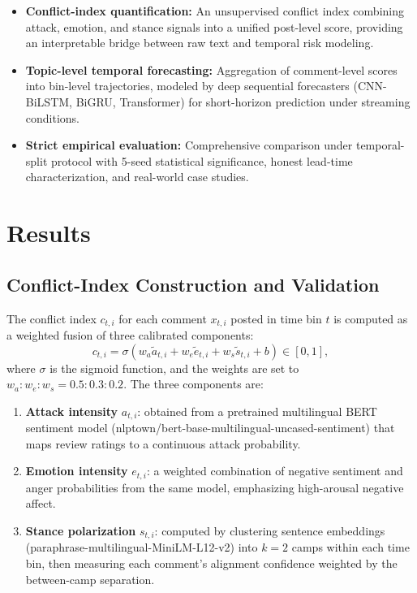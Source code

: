 \documentclass[11pt,a4paper]{article}
\begin{document}
\begin{itemize}
\item \textbf{Conflict-index quantification:} An unsupervised conflict index combining attack, emotion, and stance signals into a unified post-level score, providing an interpretable bridge between raw text and temporal risk modeling.
\item \textbf{Topic-level temporal forecasting:} Aggregation of comment-level scores into bin-level trajectories, modeled by deep sequential forecasters (CNN-BiLSTM, BiGRU, Transformer) for short-horizon prediction under streaming conditions.
\item \textbf{Strict empirical evaluation:} Comprehensive comparison under temporal-split protocol with 5-seed statistical significance, honest lead-time characterization, and real-world case studies.
\end{itemize}

\section{Results}

\subsection{Conflict-Index Construction and Validation}

The conflict index $c_{t,i}$ for each comment $x_{t,i}$ posted in time bin $t$ is computed as a weighted fusion of three calibrated components:
\begin{equation}
c_{t,i} = \sigma\!\left(w_a \tilde{a}_{t,i} + w_e \tilde{e}_{t,i} + w_s \tilde{s}_{t,i} + b\right)\in[0,1],
\label{eq:fusion}
\end{equation}
where $\sigma$ is the sigmoid function, and the weights are set to $w_a:w_e:w_s = 0.5:0.3:0.2$. The three components are:

\begin{enumerate}
\item \textbf{Attack intensity} $a_{t,i}$: obtained from a pretrained multilingual BERT sentiment model (nlptown/bert-base-multilingual-uncased-sentiment) that maps review ratings to a continuous attack probability.
\item \textbf{Emotion intensity} $e_{t,i}$: a weighted combination of negative sentiment and anger probabilities from the same model, emphasizing high-arousal negative affect.
\item \textbf{Stance polarization} $s_{t,i}$: computed by clustering sentence embeddings (paraphrase-multilingual-MiniLM-L12-v2) into $k{=}2$ camps within each time bin, then measuring each comment's alignment confidence weighted by the between-camp separation.
\end{enumerate}
\end{document}

